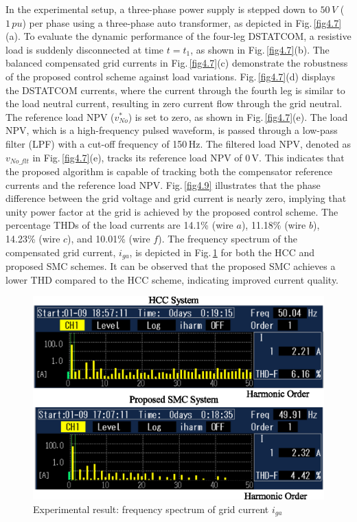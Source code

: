 In the experimental setup, a three-phase power supply is stepped down to $50\,\si{V}$ ($1\,\si{pu}$) per phase using a three-phase auto transformer, as depicted in Fig.\,\ref{fig4.7}(a). To evaluate the dynamic performance of the four-leg DSTATCOM, a resistive load is suddenly disconnected at time $t=t_{1}$, as shown in Fig.\,\ref{fig4.7}(b). The balanced compensated grid currents in Fig.\,\ref{fig4.7}(c) demonstrate the robustness of the proposed control scheme against load variations. Fig.\,\ref{fig4.7}(d) displays the DSTATCOM currents, where the current through the fourth leg is similar to the load neutral current, resulting in zero current flow through the grid neutral. The reference load NPV ($v^{*}_{No}$) is set to zero, as shown in Fig.\,\ref{fig4.7}(e). The load NPV, which is a high-frequency pulsed waveform, is passed through a low-pass filter (LPF) with a cut-off frequency of 150\,Hz. The filtered load NPV, denoted as $v_{No\_flt}$ in Fig.\,\ref{fig4.7}(e), tracks its reference load NPV of 0\,V. This indicates that the proposed algorithm is capable of tracking both the compensator reference currents and the reference load NPV. Fig.\,\ref{fig4.9} illustrates that the phase difference between the grid voltage and grid current is nearly zero, implying that unity power factor at the grid is achieved by the proposed control scheme.
The percentage THDs of the load currents are 14.1\% (wire $a$), 11.18\% (wire $b$), 14.23\% (wire $c$), and 10.01\% (wire $f$). The frequency spectrum of the compensated grid current, $i_{ga}$, is depicted in Fig.\,\ref{fig4.10} for both the HCC and proposed SMC schemes. It can be observed that the proposed SMC achieves a lower THD compared to the HCC scheme, indicating improved current quality.
\begin{figure}   
	\centering
	\includegraphics[scale=0.9]{figures/Chapter_4/Mine/THD.eps}
	\caption{Experimental result: frequency spectrum of grid current $i_{ga}$} 
	\label{fig4.10}
\end{figure} 

